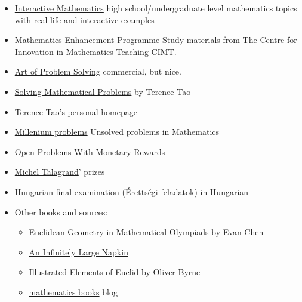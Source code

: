 \documentclass{article}
\begin{document}
\begin{itemize}
    \item \href{https://www.intmath.com/}{Interactive Mathematics} high school/undergraduate level mathematics topics with real life and interactive examples 
    
    \item \href{http://www.cimt.org.uk/projects/mep/index.htm}{Mathematics Enhancement Programme} Study materials from The Centre for Innovation in Mathematics Teaching \href{http://www.cimt.org.uk/}{CIMT}.
    
    \item \href{https://artofproblemsolving.com/online}{Art of Problem Solving} commercial, but nice.
    
    \item \href{https://www.goodreads.com/book/show/265415.Solving_Mathematical_Problems}{Solving Mathematical Problems} by Terence Tao
    
    \item \href{https://terrytao.wordpress.com/}{Terence Tao}'s personal homepage
    
    \item \href{http://www.claymath.org/millennium-problems}{Millenium problems} Unsolved problems in Mathematics
    
    \item \href{https://mathoverflow.net/questions/66084/open-problems-with-monetary-rewards}{Open Problems With Monetary Rewards}

    \item \href{https://michel.talagrand.net/prizes/}{Michel Talagrand}' prizes
    
    \item \href{https://matek.fazekas.hu/index.php?option=com_content&view=article&id=156&Itemid=217}{Hungarian final examination} (Érettségi feladatok) in Hungarian
    
    \item Other books and sources:
    \begin{itemize}
        \item \href{https://web.evanchen.cc/geombook.html}{Euclidean Geometry in Mathematical Olympiads} by Evan Chen
        \item \href{https://web.evanchen.cc/napkin.html}{An Infinitely Large Napkin}
        \item \href{https://publicdomainreview.org/collection/the-first-six-books-of-the-elements-of-euclid-1847}{Illustrated Elements of Euclid} by Oliver Byrne 
        \item \href{https://mathematicalolympiads.wordpress.com/}{mathematics books} blog
    \end{itemize}
    

\end{itemize}
\end{document}
